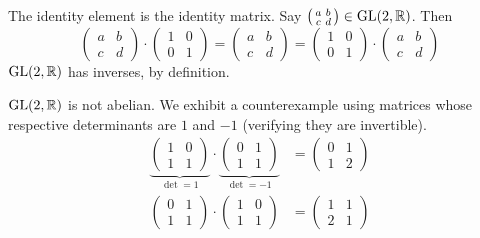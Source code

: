 \documentclass[../UNABRIDGEDalgebraNotesMSRI-UP2016.tex]{subfiles}
\begin{document}
\begin{frame}
The identity element is the identity matrix.  Say $\left(\begin{smallmatrix}a & b \\ c & d \end{smallmatrix}\right)\in\operatorname{GL}(2,\mathbb R)$.  Then
\[
\begin{pmatrix}
a & b \\
c & d
\end{pmatrix}
\cdot\begin{pmatrix}
1 & 0 \\
0 & 1
\end{pmatrix}=
\begin{pmatrix}
a & b \\
c & d
\end{pmatrix}=
\begin{pmatrix}
1 & 0 \\
0 & 1
\end{pmatrix}
\cdot
\begin{pmatrix}
a & b \\
c & d
\end{pmatrix}
\]
$\operatorname{GL}(2,\mathbb R)$ has inverses, by definition.  

\smallGap
$\operatorname{GL}(2,\mathbb R)$ is not abelian.  We exhibit a counterexample using matrices whose respective determinants are $1$ and $-1$ (verifying they are invertible).
\begin{align*}
\underbrace{\begin{pmatrix}
	1 & 0 \\
	1 & 1
	\end{pmatrix}}_{\det{}=1}\cdot
\underbrace{\begin{pmatrix}
	0 & 1 \\
	1 & 1 
\end{pmatrix}}_{\det{}=-1} &=
\begin{pmatrix}
0 & 1 \\
1 & 2
\end{pmatrix} \\
\begin{pmatrix}
	0 & 1 \\
	1 & 1
	\end{pmatrix}\cdot
\begin{pmatrix}
	1 & 0 \\
	1 & 1 
\end{pmatrix} &=
\begin{pmatrix}
1 & 1 \\
2 & 1
\end{pmatrix}
\end{align*}
\end{frame}
\end{document}
